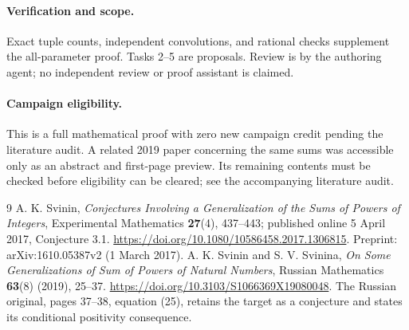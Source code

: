 \documentclass[11pt]{article}
\begin{document}
\paragraph{Verification and scope.}
Exact tuple counts, independent convolutions, and rational checks
supplement the all-parameter proof. Tasks 2--5 are proposals.
Review is by the authoring agent; no independent review or proof
assistant is claimed.

\paragraph{Campaign eligibility.}
This is a full mathematical proof with zero new campaign credit
pending the literature audit. A related 2019 paper concerning the
same sums was accessible only as an abstract and first-page
preview. Its remaining contents must be checked before eligibility
can be cleared; see the accompanying literature audit.

\begin{thebibliography}{9}
 A. K. Svinin, \emph{Conjectures Involving a Generalization
of the Sums of Powers of Integers}, Experimental Mathematics
\textbf{27}(4), 437--443; published online 5 April 2017,
Conjecture 3.1. \url{https://doi.org/10.1080/10586458.2017.1306815}.
Preprint: arXiv:1610.05387v2 (1 March 2017).
 A. K. Svinin and S. V. Svinina,
\emph{On Some Generalizations of Sum of Powers of Natural Numbers},
Russian Mathematics \textbf{63}(8) (2019), 25--37.
\url{https://doi.org/10.3103/S1066369X19080048}.
The Russian original, pages 37--38, equation (25), retains the
target as a conjecture and states its conditional positivity
consequence.
\end{thebibliography}
\end{document}
